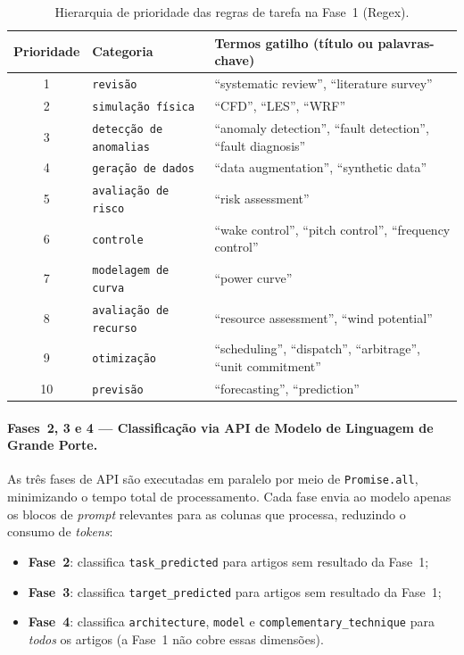 \begin{table}[htbp]
\centering
\caption{Hierarquia de prioridade das regras de tarefa na Fase~1
         (Regex).}
\label{tab:regex-priority}
\begin{tabular}{clp{7cm}}
\toprule
\textbf{Prioridade} & \textbf{Categoria} & \textbf{Termos gatilho (título ou palavras-chave)} \\
\midrule
1 & \texttt{revisão}              & ``systematic review'', ``literature survey'' \\
2 & \texttt{simulação física}     & ``CFD'', ``LES'', ``WRF'' \\
3 & \texttt{detecção de anomalias}& ``anomaly detection'', ``fault detection'', ``fault diagnosis'' \\
4 & \texttt{geração de dados}     & ``data augmentation'', ``synthetic data'' \\
5 & \texttt{avaliação de risco}   & ``risk assessment'' \\
6 & \texttt{controle}             & ``wake control'', ``pitch control'', ``frequency control'' \\
7 & \texttt{modelagem de curva}   & ``power curve'' \\
8 & \texttt{avaliação de recurso} & ``resource assessment'', ``wind potential'' \\
9 & \texttt{otimização}           & ``scheduling'', ``dispatch'', ``arbitrage'', ``unit commitment'' \\
10& \texttt{previsão}             & ``forecasting'', ``prediction'' \\
\bottomrule
\end{tabular}
\end{table}

\paragraph{Fases~2, 3 e 4 — Classificação via API de Modelo de
Linguagem de Grande Porte.}

As três fases de API são executadas em paralelo por meio de
\texttt{Promise.all}, minimizando o tempo total de processamento.
Cada fase envia ao modelo apenas os blocos de \textit{prompt}
relevantes para as colunas que processa, reduzindo o consumo de
\textit{tokens}:

\begin{itemize}
  \item \textbf{Fase~2}: classifica \texttt{task\_predicted} para
        artigos sem resultado da Fase~1;
  \item \textbf{Fase~3}: classifica \texttt{target\_predicted} para
        artigos sem resultado da Fase~1;
  \item \textbf{Fase~4}: classifica \texttt{architecture},
        \texttt{model} e \texttt{complementary\_technique} para
        \emph{todos} os artigos (a Fase~1 não cobre essas
        dimensões).
\end{itemize}

